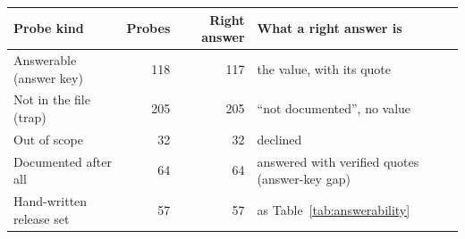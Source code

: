 \begin{tabular}{@{}lrrl@{}}
\toprule
Probe kind & Probes & Right answer & What a right answer is \\
\midrule
Answerable (answer key) & 118 & 117 & the value, with its quote \\
Not in the file (trap) & 205 & 205 & ``not documented'', no value \\
Out of scope & 32 & 32 & declined \\
Documented after all & 64 & 64 & answered with verified quotes (answer-key gap) \\
Hand-written release set & 57 & 57 & as Table~\ref{tab:answerability} \\
\bottomrule
\end{tabular}
